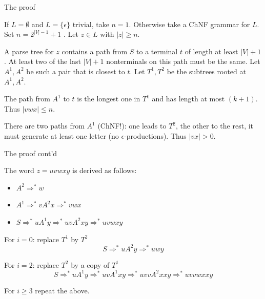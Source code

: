 \documentclass[handout]{beamer}
\begin{document}
\begin{frame}{The proof}

	If $L=\emptyset$ and $L=\{\epsilon\}$ trivial, take $n=1$. Otherwise take a ChNF grammar for $L$. Set $n=2^{|V|-1}+1$ . Let $z\in L$ with $|z|\geq n$.
	
	A parse tree for $z$ contains a path from $S$ to a terminal $t$ of length at least $|V|+1$. At least two of the last $|V|+1$ nonterminals on this path must be the same. Let $A^1, A^2$ be such a pair that is closest to $t$. Let $T^1,T^2$ be the subtrees rooted at $A^1, A^2$.
		
	The path from $A^1$ to $t$ is the longest one in $T^1$ and has length at most $(k+1)$. Thus $|vwx|\leq n $.

	There are two paths from $A^1$ (ChNF!): one leads to $T^2$, the other to the rest, it must generate at least one letter (no $\epsilon$-productions). Thus $|vx|>0$.

\end{frame}


\begin{frame}{The proof cont'd}

	The word $z=uvwxy$ is derived as follows:
	\begin{itemize}
		\item $A^2\Rightarrow^* w$
		\item $A^1\Rightarrow^*vA^2x\Rightarrow^* vwx$
		\item $S\Rightarrow^*uA^1y\Rightarrow^*uvA^2xy\Rightarrow^*uvwxy$
	\end{itemize}

	For $i=0$: replace $T^1$ by $T^2$
	$$
	S\Rightarrow^*uA^2y\Rightarrow^*uwy
	$$

	For $i=2$: replace $T^2$ by a copy of $T^1$
	$$
	S\Rightarrow^*uA^1y\Rightarrow^*uvA^1xy\Rightarrow^*uvvA^2xxy\Rightarrow^*uvvwxxy
	$$

	For $i\geq 3$ repeat the above.\hfill\qedsymbol
	
\end{frame}
\end{document}
